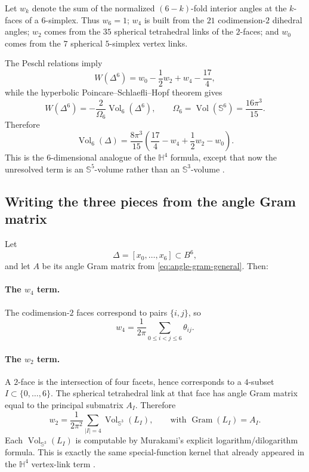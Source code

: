 \documentclass[11pt]{article}
\newcommand{\Hh}{\mathbb{H}}
\newcommand{\Ss}{\mathbb{S}}
\newcommand{\Vol}{\operatorname{Vol}}
\newcommand{\Om}{\Omega}
\begin{document}
Let $w_k$ denote the sum of the normalized $(6-k)$-fold interior angles at the $k$-faces of a
$6$-simplex.  Thus $w_6=1$; $w_4$ is built from the $21$ codimension-$2$ dihedral angles; $w_2$
comes from the $35$ spherical tetrahedral links of the $2$-faces; and $w_0$ comes from the $7$
spherical $5$-simplex vertex links.

The Peschl relations imply
\begin{equation}
\label{eq:W-six}
W(\Delta^6)=w_0-\frac12 w_2+w_4-\frac{17}{4},
\end{equation}
while the hyperbolic Poincare--Schlaefli--Hopf theorem gives
\begin{equation}
\label{eq:Hopf-six}
W(\Delta^6)=-\frac{2}{\Om_6}\Vol_6(\Delta^6),
\qquad
\Om_6=\Vol(\Ss^6)=\frac{16\pi^3}{15}.
\end{equation}
Therefore
\begin{equation}
\label{eq:h6-main}
\boxed{
\Vol_6(\Delta)
=
\frac{8\pi^3}{15}
\left(
\frac{17}{4}-w_4+\frac12 w_2-w_0
\right).
}
\end{equation}
This is the $6$-dimensional analogue of the $\Hh^4$ formula, except that now the unresolved term is
an $\Ss^5$-volume rather than an $\Ss^3$-volume \cite{KellerhalsZehrt,Heckman}.

\subsection*{Writing the three pieces from the angle Gram matrix}

Let
\[
\Delta=[x_0,\dots,x_6]\subset B^6,
\]
and let $A$ be its angle Gram matrix from \eqref{eq:angle-gram-general}.  Then:

\paragraph{The $w_4$ term.}
The codimension-$2$ faces correspond to pairs $\{i,j\}$, so
\begin{equation}
\label{eq:w4}
 w_4=\frac{1}{2\pi}\sum_{0\le i<j\le 6}\theta_{ij}.
\end{equation}

\paragraph{The $w_2$ term.}
A $2$-face is the intersection of four facets, hence corresponds to a $4$-subset
$I\subset\{0,\dots,6\}$.  The spherical tetrahedral link at that face has angle Gram matrix equal to
the principal submatrix $A_I$.  Therefore
\begin{equation}
\label{eq:w2}
 w_2=\frac{1}{2\pi^2}\sum_{|I|=4}\Vol_{\Ss^3}(L_I),
\qquad
\text{with }\operatorname{Gram}(L_I)=A_I.
\end{equation}
Each $\Vol_{\Ss^3}(L_I)$ is computable by Murakami's explicit logarithm/dilogarithm formula.
This is exactly the same special-function kernel that already appeared in the $\Hh^4$ vertex-link
term \cite{MurakamiSpherical}.
\end{document}
